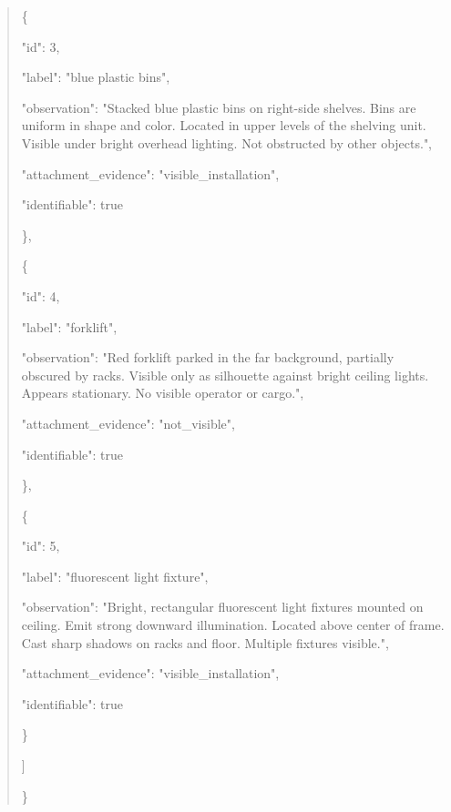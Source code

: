 \documentclass[10pt,a4paper]{article}
\begin{document}
\begin{quote}
    \{\par
      "id":\allowbreak{} 3,\allowbreak{}\par
      "label":\allowbreak{} "blue plastic bins",\allowbreak{}\par
      "observation":\allowbreak{} "Stacked blue plastic bins on right-side shelves. Bins are uniform in shape and color. Located in upper levels of the shelving unit. Visible under bright overhead lighting. Not obstructed by other objects.",\allowbreak{}\par
      "attachment\_evidence":\allowbreak{} "visible\_installation",\allowbreak{}\par
      "identifiable":\allowbreak{} true\par
    \},\allowbreak{}\par
    \{\par
      "id":\allowbreak{} 4,\allowbreak{}\par
      "label":\allowbreak{} "forklift",\allowbreak{}\par
      "observation":\allowbreak{} "Red forklift parked in the far background,\allowbreak{} partially obscured by racks. Visible only as silhouette against bright ceiling lights. Appears stationary. No visible operator or cargo.",\allowbreak{}\par
      "attachment\_evidence":\allowbreak{} "not\_visible",\allowbreak{}\par
      "identifiable":\allowbreak{} true\par
    \},\allowbreak{}\par
    \{\par
      "id":\allowbreak{} 5,\allowbreak{}\par
      "label":\allowbreak{} "fluorescent light fixture",\allowbreak{}\par
      "observation":\allowbreak{} "Bright,\allowbreak{} rectangular fluorescent light fixtures mounted on ceiling. Emit strong downward illumination. Located above center of frame. Cast sharp shadows on racks and floor. Multiple fixtures visible.",\allowbreak{}\par
      "attachment\_evidence":\allowbreak{} "visible\_installation",\allowbreak{}\par
      "identifiable":\allowbreak{} true\par
    \}\par
  ]\par
\}
\end{quote}
\end{document}
